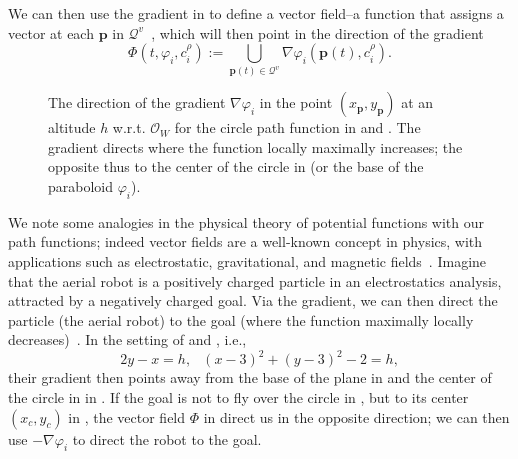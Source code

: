 We can then use the gradient in  to define a vector field--a function that assigns a vector at each $\mathbf{p}$ in $\mathcal{Q}^v$~\citep{lavalle2006planning}, which will then point in the direction of the gradient
\begin{equation}\label{eq:vec-field-def}
  \varPhi(t,\varphi_i,c_i^\rho):=\bigcup\limits_{\mathbf{p}(t)\in\mathcal{Q}^v}{\nabla\varphi_i(\mathbf{p}(t),c_i^\rho)}.
\end{equation}

\begin{figure}[ht!]
  \centering
  \selectfont
  
  \caption[The direction of the gradient on a circle path function]{The direction of the gradient $\nabla\varphi_i$ in the point $(x_\mathbf{p},y_{\mathbf{p}})$ at an altitude $h$ w.r.t. $\mathcal{O}_W$ for the circle path function in  and . The gradient directs where the function locally maximally increases; the opposite thus to the center of the circle in  (or the base of the paraboloid $\varphi_i$).}
  \label{fig:grad}
\end{figure}
We note some analogies in the physical theory of potential functions with our path functions; indeed vector fields are a well-known concept in physics, with applications such as electrostatic, gravitational, and magnetic fields~\citep{feynman2015feynman}. Imagine that the aerial robot is a positively charged particle in an electrostatics analysis, attracted by a negatively charged goal. Via the gradient, we can then direct the particle (the aerial robot) to the goal (where the function maximally locally decreases)~\citep{choset2005principles}. In the setting of  and , i.e., 
\begin{equation}\label{eq:two-paths}
  2y-x=h,\,\,\,\ (x-3)^2+(y-3)^2-2=h,
\end{equation}
their gradient then points away from the base of the plane in  and the center of the circle in  in . If the goal is not to fly over the circle in , but to its center $(x_c,y_c)$ in , the vector field $\varPhi$ in  direct us in the opposite direction; we can then use $-\nabla\varphi_i$ to direct the robot to the goal.


